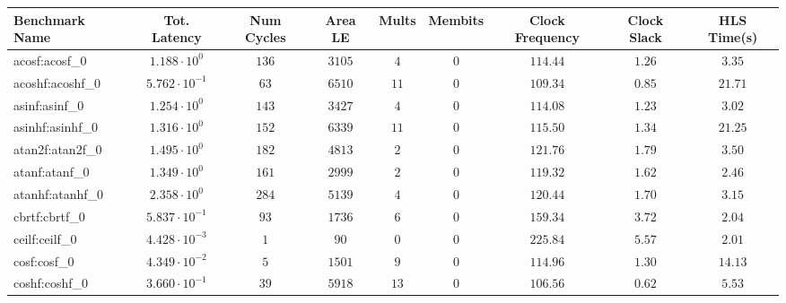 \begin{tabular}{|l|c|c|c|c|c|c|c|c|}
\hline
Benchmark Name               & Tot. Latency            & Num Cycles & Area LE    & Mults   & Membits & Clock Frequency & Clock Slack & HLS Time(s) \\
\hline
acosf:acosf\_0               & $ 1.188 \cdot 10^{0}  $ & $ 136    $ & $ 3105   $ & $ 4   $ & $ 0   $ & $ 114.44      $ & $ 1.26    $ & $ 3.35    $ \\
acoshf:acoshf\_0             & $ 5.762 \cdot 10^{-1} $ & $ 63     $ & $ 6510   $ & $ 11  $ & $ 0   $ & $ 109.34      $ & $ 0.85    $ & $ 21.71   $ \\
asinf:asinf\_0               & $ 1.254 \cdot 10^{0}  $ & $ 143    $ & $ 3427   $ & $ 4   $ & $ 0   $ & $ 114.08      $ & $ 1.23    $ & $ 3.02    $ \\
asinhf:asinhf\_0             & $ 1.316 \cdot 10^{0}  $ & $ 152    $ & $ 6339   $ & $ 11  $ & $ 0   $ & $ 115.50      $ & $ 1.34    $ & $ 21.25   $ \\
atan2f:atan2f\_0             & $ 1.495 \cdot 10^{0}  $ & $ 182    $ & $ 4813   $ & $ 2   $ & $ 0   $ & $ 121.76      $ & $ 1.79    $ & $ 3.50    $ \\
atanf:atanf\_0               & $ 1.349 \cdot 10^{0}  $ & $ 161    $ & $ 2999   $ & $ 2   $ & $ 0   $ & $ 119.32      $ & $ 1.62    $ & $ 2.46    $ \\
atanhf:atanhf\_0             & $ 2.358 \cdot 10^{0}  $ & $ 284    $ & $ 5139   $ & $ 4   $ & $ 0   $ & $ 120.44      $ & $ 1.70    $ & $ 3.15    $ \\
cbrtf:cbrtf\_0               & $ 5.837 \cdot 10^{-1} $ & $ 93     $ & $ 1736   $ & $ 6   $ & $ 0   $ & $ 159.34      $ & $ 3.72    $ & $ 2.04    $ \\
ceilf:ceilf\_0               & $ 4.428 \cdot 10^{-3} $ & $ 1      $ & $ 90     $ & $ 0   $ & $ 0   $ & $ 225.84      $ & $ 5.57    $ & $ 2.01    $ \\
cosf:cosf\_0                 & $ 4.349 \cdot 10^{-2} $ & $ 5      $ & $ 1501   $ & $ 9   $ & $ 0   $ & $ 114.96      $ & $ 1.30    $ & $ 14.13   $ \\
coshf:coshf\_0               & $ 3.660 \cdot 10^{-1} $ & $ 39     $ & $ 5918   $ & $ 13  $ & $ 0   $ & $ 106.56      $ & $ 0.62    $ & $ 5.53    $ \\

\end{tabular}
